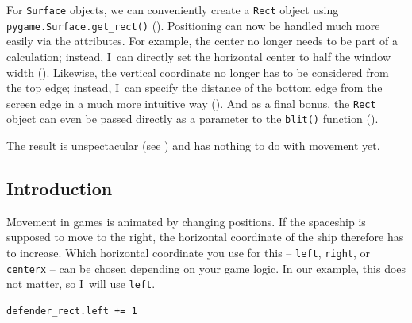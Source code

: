 
For \texttt{Surface} objects, we can conveniently create a \texttt{Rect} object using \texttt{pygame.Surface\-.get\-\_rect()} (). Positioning can now be handled much more easily via the attributes. For example, the center no longer needs to be part of a calculation; instead, I~can directly set the horizontal center to half the window width (). Likewise, the vertical coordinate no longer has to be considered from the top edge; instead, I~can specify the distance of the bottom edge from the screen edge in a much more intuitive way (). And as a final bonus, the \texttt{Rect} object can even be passed directly as a parameter to the \texttt{blit()} function ().


The result is unspectacular (see ) and has
nothing to do with movement yet.

\subsection{Introduction}

 Movement in games is animated by changing positions. If the spaceship is supposed to move to the right, the horizontal coordinate of the ship therefore has to increase. Which horizontal coordinate you use for this -- \texttt{left}, \texttt{right}, or \texttt{centerx} -- can be chosen depending on your game logic. In our example, this does not matter, so I~will use \texttt{left}.

\lstset{firstnumber=26}
\begin{lstlisting}
defender_rect.left += 1
\end{lstlisting}

